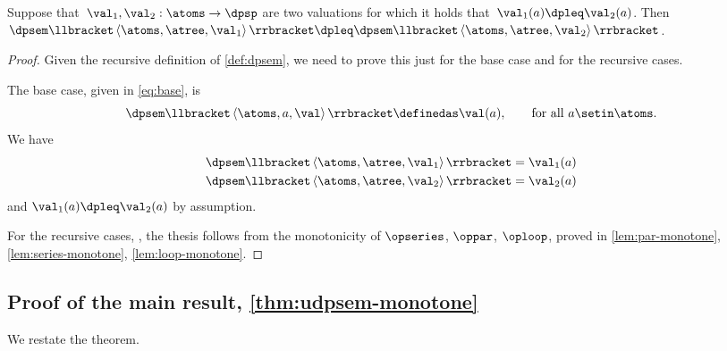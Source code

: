 \begin{lemma}
    \label{lem:dpsem-monotone}
    Suppose that~$\val_{1},\val_{2}:\atoms\rightarrow\dpsp$
    are two valuations for which it holds that~$\val_{1}(a)\dpleq\val_{2}(a)$.
    Then~$\dpsem\llbracket\left\langle \atoms,\atree,\val_{1}\right\rangle \rrbracket\dpleq\dpsem\llbracket\left\langle \atoms,\atree,\val_{2}\right\rangle \rrbracket$.
\end{lemma}
\begin{proof}
    Given the recursive definition of \cref{def:dpsem}, we need
    to prove this just for the base case and for the recursive cases.

    The base case, given in \cref{eq:base}, is
    \[
        \dpsem\llbracket\left\langle \atoms,a,\val\right\rangle \rrbracket\definedas\val(a),\qquad\text{for all}\ a\setin\atoms.
    \]
    We have
    \begin{align*}
        \dpsem\llbracket\left\langle \atoms,\atree,\val_{1}\right\rangle \rrbracket & =\val_{1}(a) \\
        \dpsem\llbracket\left\langle \atoms,\atree,\val_{2}\right\rangle \rrbracket & =\val_{2}(a)
    \end{align*}
    and $\val_{1}(a)\dpleq\val_{2}(a)$ by assumption.

    For the recursive cases, ,
    the thesis follows from the monotonicity of $\opseries$, $\oppar$,
    $\oploop$, proved in \cref{lem:par-monotone}, \cref{lem:series-monotone},
    \cref{lem:loop-monotone}.
\end{proof}

\subsection{Proof of the main result, \cref{thm:udpsem-monotone}}

\label{subsec:proof-main-result}

We restate the theorem.

